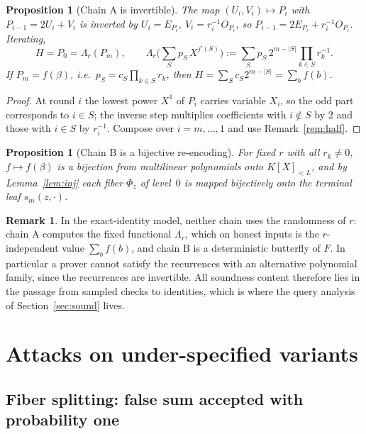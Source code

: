 \documentclass[11pt]{article}
\newtheorem{proposition}[theorem]{Proposition}
\theoremstyle{definition}
\newtheorem{remark}[theorem]{Remark}
\newcommand{\K}{K}
\begin{document}
\begin{proposition}[Chain A is invertible]\label{prop:Lambda}
The map $(U_i,V_i)\mapsto P_i$ with $P_{i-1}=2U_i+V_i$ is inverted by $U_i=E_{P_i}$, $V_i=r_i^{-1}O_{P_i}$, so $P_{i-1}=2E_{P_i}+r_i^{-1}O_{P_i}$. Iterating,
\[
H=P_0=\Lambda_r(P_m),\qquad
\Lambda_r\Big(\sum_{S}p_S\,X^{j'(S)}\Big):=\sum_S p_S\,2^{m-|S|}\prod_{k\in S}r_k^{-1}.
\]
If $P_m=f(\beta)$, i.e.\ $p_S=c_S\prod_{k\in S}r_k$, then $H=\sum_Sc_S2^{m-|S|}=\sum_bf(b)$.
\end{proposition}
\begin{proof}
At round $i$ the lowest power $X^1$ of $P_i$ carries variable $X_i$, so the odd part corresponds to $i\in S$; the inverse step multiplies coefficients with $i\notin S$ by $2$ and those with $i\in S$ by $r_i^{-1}$. Compose over $i=m,\dots,1$ and use Remark~\ref{rem:half}.
\end{proof}

\begin{proposition}[Chain B is a bijective re-encoding]\label{prop:Bbij}
For fixed $r$ with all $r_k\ne0$, $f\mapsto f(\beta)$ is a bijection from multilinear polynomials onto $\K[X]_{<L}$, and by Lemma~\ref{lem:inj} each fiber $\Phi_z$ of level~$0$ is mapped bijectively onto the terminal leaf $s_m(z,\cdot)$.
\end{proposition}

\begin{remark}\label{rem:norandom}
In the exact-identity model, neither chain uses the randomness of $r$: chain A computes the fixed functional $\Lambda_r$, which on honest inputs is the $r$-independent value $\sum_bf(b)$, and chain B is a deterministic butterfly of $F$. In particular a prover cannot satisfy the recurrences with an alternative polynomial family, since the recurrences are invertible. All soundness content therefore lies in the passage from sampled checks to identities, which is where the query analysis of Section~\ref{sec:sound} lives.
\end{remark}

\section{Attacks on under-specified variants}\label{sec:attacks}

\subsection{Fiber splitting: false sum accepted with probability one}
\end{document}
